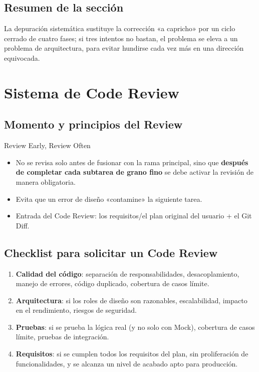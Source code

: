 \documentclass[a4paper]{article}
\begin{document}
\subsection{Resumen de la sección}

La depuración sistemática sustituye la corrección «a capricho» por un ciclo cerrado de cuatro fases; si tres intentos no bastan, el problema se eleva a un problema de arquitectura, para evitar hundirse cada vez más en una dirección equivocada.
\section{Sistema de Code Review}

\subsection{Momento y principios del Review}

\begin{importantbox}{{Review Early, Review Often}}
\begin{itemize}
    \item No se revisa solo antes de fusionar con la rama principal, sino que \textbf{después de completar cada subtarea de grano fino} se debe activar la revisión de manera obligatoria.
    \item Evita que un error de diseño «contamine» la siguiente tarea.
    \item Entrada del Code Review: los requisitos/el plan original del usuario + el Git Diff.
\end{itemize}
\end{importantbox}

\subsection{Checklist para solicitar un Code Review}

\begin{enumerate}
    \item \textbf{Calidad del código}: separación de responsabilidades, desacoplamiento, manejo de errores, código duplicado, cobertura de casos límite.
    \item \textbf{Arquitectura}: si los roles de diseño son razonables, escalabilidad, impacto en el rendimiento, riesgos de seguridad.
    \item \textbf{Pruebas}: si se prueba la lógica real (y no solo con Mock), cobertura de casos límite, pruebas de integración.
    \item \textbf{Requisitos}: si se cumplen todos los requisitos del plan, sin proliferación de funcionalidades, y se alcanza un nivel de acabado apto para producción.
\end{enumerate}
\end{document}
